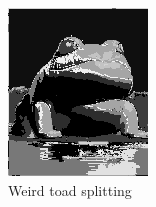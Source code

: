 \documentclass{beamer}
\begin{document}
\begin{frame}
  \begin{figure}[htb]
    \centering
    \begin{subfigure}[b]{0.24\linewidth}
      \includegraphics[width=\linewidth]{images/toad_split.png}
      \caption{Weird toad splitting}
    \end{subfigure}
    \begin{subfigure}[b]{0.24\linewidth}

\end{subfigure}
\end{figure}
\end{frame}
\end{document}
